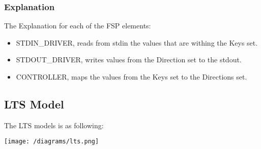 \hypertarget{explanation}{%
\subsubsection{Explanation}\label{explanation}}

The Explanation for each of the FSP elements:

\begin{itemize}
\tightlist
\item
  STDIN\_DRIVER, reads from stdin the values that are withing the Keys
  set.
\item
  STDOUT\_DRIVER, writes values from the Direction set to the stdout.
\item
  CONTROLLER, maps the values from the Keys set to the Directions set.
\end{itemize}

\hypertarget{lts-model}{%
\subsection{LTS Model}\label{lts-model}}

The LTS models is as following:

\texttt{[image: /diagrams/lts.png]}
